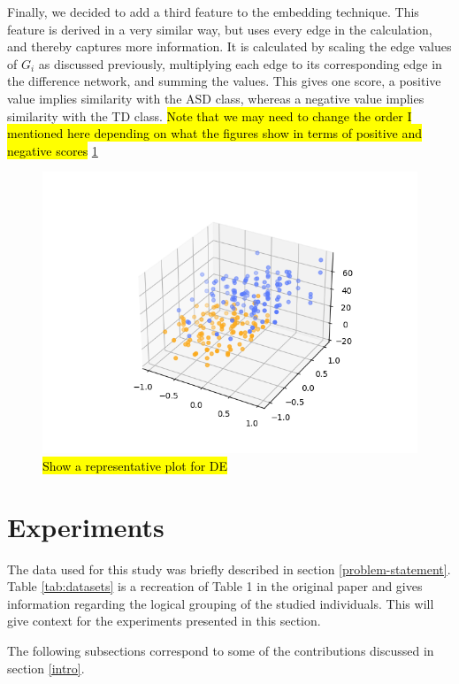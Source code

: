 \documentclass[sigconf]{acmart}
\begin{document}
Finally, we decided to add a third feature to the embedding technique.
This feature is derived in a very similar way, but uses every edge in the calculation, and thereby captures more information.
It is calculated by scaling the edge values of $G_i$ as discussed previously, multiplying each edge to its corresponding edge in the difference network, and summing the values.
This gives one score, a positive value implies similarity with the ASD class, whereas a negative value implies similarity with the TD class.
\hl{Note that we may need to change the order I mentioned here depending on what the figures show in terms of positive and negative scores} \ref{fig:DE}

\begin{figure}
    \centering
    \includegraphics[width=\columnwidth, keepaspectratio=true]{test.png}
    \caption{\hl{Show a representative plot for DE}}
    \label{fig:DE}
\end{figure}


\section{Experiments} \label{experiments}

The data used for this study was briefly described in section \ref{problem-statement}.
Table \ref{tab:datasets} is a recreation of Table 1 in the original paper and gives information regarding the logical grouping of the studied individuals.
This will give context for the experiments presented in this section.

The following subsections correspond to some of the contributions discussed in section \ref{intro}.
\end{document}
